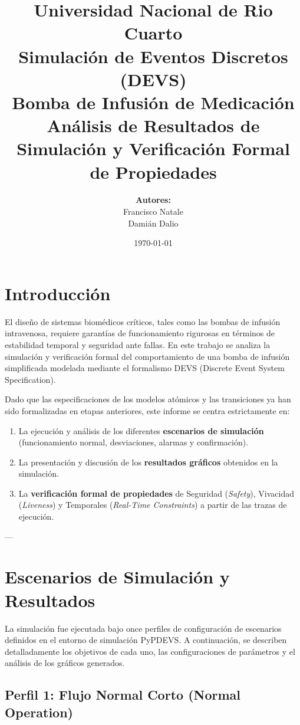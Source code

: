 \documentclass[11pt,a4paper]{article}
\title{
    \vspace{-2cm}
    \textbf{\large Universidad Nacional de Rio Cuarto} \\
    \textbf{\large Simulación de Eventos Discretos (DEVS)} \\
    \vspace{1.5cm}
    \Huge \textbf{Bomba de Infusión de Medicación} \\
    \vspace{0.5cm}
    \Large Análisis de Resultados de Simulación y Verificación Formal de Propiedades \\
    \vspace{1.5cm}
}
\author{
    \textbf{Autores:} \\
    Francisco Natale \\
    Damián Dalio \\
    \vspace{1.5cm}
}
\date{\today}
\begin{document}
\maketitle
\clearpage

\tableofcontents
\clearpage

\section{Introducción}
El diseño de sistemas biomédicos críticos, tales como las bombas de infusión intravenosa, requiere garantías de funcionamiento rigurosas en términos de estabilidad temporal y seguridad ante fallas. En este trabajo se analiza la simulación y verificación formal del comportamiento de una bomba de infusión simplificada modelada mediante el formalismo DEVS (Discrete Event System Specification).

Dado que las especificaciones de los modelos atómicos y las transiciones ya han sido formalizadas en etapas anteriores, este informe se centra estrictamente en:
\begin{enumerate}
    \item La ejecución y análisis de los diferentes \textbf{escenarios de simulación} (funcionamiento normal, desviaciones, alarmas y confirmación).
    \item La presentación y discusión de los \textbf{resultados gráficos} obtenidos en la simulación.
    \item La \textbf{verificación formal de propiedades} de Seguridad (\textit{Safety}), Vivacidad (\textit{Liveness}) y Temporales (\textit{Real-Time Constraints}) a partir de las trazas de ejecución.
\end{enumerate}

---

\section{Escenarios de Simulación y Resultados}
La simulación fue ejecutada bajo once perfiles de configuración de escenarios definidos en el entorno de simulación PyPDEVS. A continuación, se describen detalladamente los objetivos de cada uno, las configuraciones de parámetros y el análisis de los gráficos generados.

\subsection{Perfil 1: Flujo Normal Corto (Normal Operation)}
\end{document}
